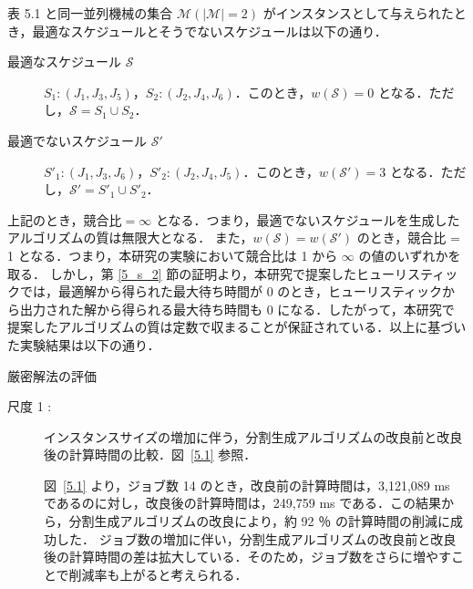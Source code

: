\documentclass[12pt]{optlab-bachelor}
\begin{document}
表 5.1 と同一並列機械の集合 $\mathcal{M} (|\mathcal{M}| = 2)$ がインスタンスとして与えられたとき，最適なスケジュールとそうでないスケジュールは以下の通り．
\begin{description}
  \item[最適なスケジュール $\mathcal{S}$] $S_1 : (J_1, J_3, J_5)$，$S_2 : (J_2, J_4, J_6)$．このとき，$w(\mathcal{S}) = 0$ となる．ただし，$\mathcal{S} = S_1 \cup S_2$．
  \item[最適でないスケジュール $\mathcal{S}'$] $S'_1 : (J_1, J_3, J_6)$，$S'_2 : (J_2, J_4, J_5)$．このとき，$w(\mathcal{S}') = 3$ となる．ただし，$\mathcal{S}' = S'_1 \cup S'_2$．
\end{description}

上記のとき，$\text{競合比} = \infty$ となる．つまり，最適でないスケジュールを生成したアルゴリズムの質は無限大となる．
また，$w(\mathcal{S}) = w(\mathcal{S}')$ のとき，競合比 = 1 となる．つまり，本研究の実験において競合比は 1 から $\infty$ の値のいずれかを取る．
しかし，第 \ref{5_s_2} 節の証明より，本研究で提案したヒューリスティックでは，最適解から得られた最大待ち時間が 0 のとき，ヒューリスティックから出力された解から得られる最大待ち時間も 0 になる．したがって，本研究で提案したアルゴリズムの質は定数で収まることが保証されている．以上に基づいた実験結果は以下の通り．
\begin{description}
  \item[厳密解法の評価]
\end{description}
\begin{description}
  \item[尺度 1 :] インスタンスサイズの増加に伴う，分割生成アルゴリズムの改良前と改良後の計算時間の比較．図~\ref{5.1} 参照．

  図~\ref{5.1} より，ジョブ数 14 のとき，改良前の計算時間は，3,121,089 ms であるのに対し，改良後の計算時間は，249,759 ms である．この結果から，分割生成アルゴリズムの改良により，約 92 ％ の計算時間の削減に成功した．
  ジョブ数の増加に伴い，分割生成アルゴリズムの改良前と改良後の計算時間の差は拡大している．そのため，ジョブ数をさらに増やすことで削減率も上がると考えられる．
\end{description}
\end{document}
